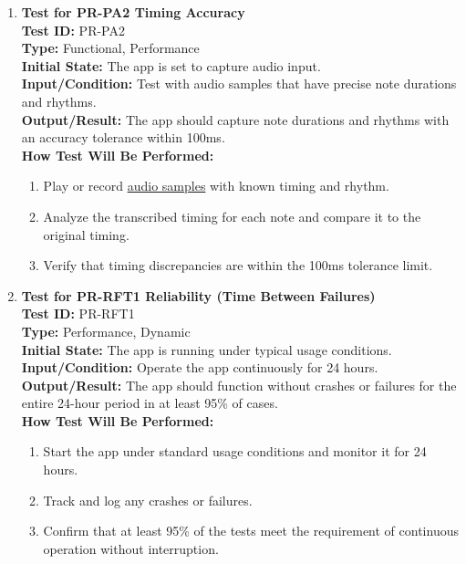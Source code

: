 \documentclass[12pt, titlepage]{article}
\begin{document}
\begin{enumerate}
    \item \textbf{Test for PR-PA2 Timing Accuracy} \\
      \newline
      \textbf{Test ID:} PR-PA2 \\
      \textbf{Type:} Functional, Performance \\
      \textbf{Initial State:} The app is set to capture audio input. \\
      \textbf{Input/Condition:} Test with audio samples that have precise note durations and rhythms. \\
      \textbf{Output/Result:} The app should capture note durations and rhythms with an accuracy tolerance within 100ms. \\
      \textbf{How Test Will Be Performed:}
      \begin{enumerate}
          \item Play or record \href{https://github.com/JaakLipp/ScoreGen/tree/main/test/TestingDatasets/piano-samples/sample-songs}{audio samples} with known timing and rhythm.
          \item Analyze the transcribed timing for each note and compare it to the original timing.
          \item Verify that timing discrepancies are within the 100ms tolerance limit.
      \end{enumerate}

    \item \textbf{Test for PR-RFT1 Reliability (Time Between Failures)} \\
      \newline
      \textbf{Test ID:} PR-RFT1 \\
      \textbf{Type:} Performance, Dynamic \\
      \textbf{Initial State:} The app is running under typical usage conditions. \\
      \textbf{Input/Condition:} Operate the app continuously for 24 hours. \\
      \textbf{Output/Result:} The app should function without crashes or failures for the entire 24-hour period in at least 95\% of cases. \\
      \textbf{How Test Will Be Performed:}
      \begin{enumerate}
          \item Start the app under standard usage conditions and monitor it for 24 hours.
          \item Track and log any crashes or failures.
          \item Confirm that at least 95\% of the tests meet the requirement of continuous operation without interruption.
      \end{enumerate}


\end{enumerate}
\end{document}
